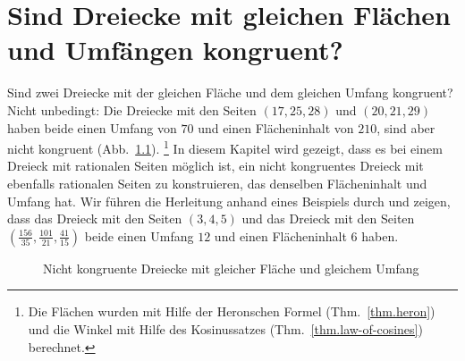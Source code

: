 
\chapter{Sind Dreiecke mit gleichen Flächen und Umfängen kongruent?}\label{c.congruent}


Sind zwei Dreiecke mit der gleichen Fläche und dem gleichen Umfang kongruent? Nicht unbedingt:  Die Dreiecke mit den Seiten $(17,25,28)$ und $(20,21,29)$ haben beide einen Umfang von $70$ und einen Flächeninhalt von $210$, sind aber nicht kongruent (Abb.~\ref{f.congruent-first-example}). \footnote{Die Flächen wurden mit Hilfe der Heronschen Formel (Thm.~\ref{thm.heron}) und die Winkel mit Hilfe des Kosinussatzes (Thm.~\ref{thm.law-of-cosines}) berechnet.} In diesem Kapitel wird gezeigt, dass es bei einem Dreieck mit rationalen Seiten möglich ist, ein nicht kongruentes Dreieck mit ebenfalls rationalen Seiten zu konstruieren, das denselben Flächeninhalt und Umfang hat.
Wir führen die Herleitung anhand eines Beispiels durch und zeigen, dass das Dreieck mit den Seiten $(3,4,5)$ und das Dreieck mit den Seiten 
$\left(\frac{156}{35}, \frac{101}{21}, \frac{41}{15}\right)$ beide einen Umfang $12$ und einen Flächeninhalt $6$ haben.

\begin{figure}[b]
\begin{center}
\end{center}
\caption{Nicht kongruente Dreiecke mit gleicher Fläche und gleichem Umfang}\label{f.congruent-first-example}
\end{figure}


